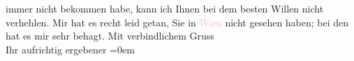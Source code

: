                     immer nicht bekommen habe, kann ich Ihnen bei dem besten Willen nicht
                    verhehlen.\pend
           \pstart
           Mir hat es recht leid getan, Sie in \textcolor{pink}{Wien}{}\ledrightnote{\textcolor{pink}{Wien}} nicht
                    gesehen  haben; bei den \label{K_L01360_1v}\label{K_L01360_1h} hat es mir sehr behagt.\pend
           \pstart
           Mit verbindlichem Gruss{\\[\baselineskip]} Ihr aufrichtig ergebener\pend
           \leftskip=0em{}\endnumbering{}  
      